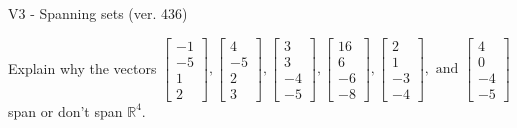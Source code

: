 \begin{exercise}
  \begin{exerciseTitle}V3 - Spanning sets (ver. 436)\end{exerciseTitle}
  \begin{exerciseStatement}
    Explain why the vectors \(\left[\begin{array}{r}
-1 \\
-5 \\
1 \\
2
\end{array}\right] , \left[\begin{array}{r}
4 \\
-5 \\
2 \\
3
\end{array}\right] , \left[\begin{array}{r}
3 \\
3 \\
-4 \\
-5
\end{array}\right] , \left[\begin{array}{r}
16 \\
6 \\
-6 \\
-8
\end{array}\right] , \left[\begin{array}{r}
2 \\
1 \\
-3 \\
-4
\end{array}\right] , \text{ and } \left[\begin{array}{r}
4 \\
0 \\
-4 \\
-5
\end{array}\right]\) span or don't span \(\mathbb{R}^4\). 
	



\end{exerciseStatement}
\end{exercise}
